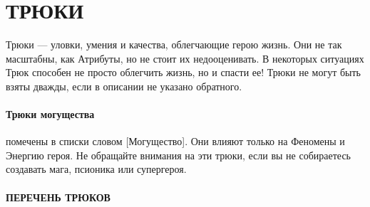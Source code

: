 \section{ТРЮКИ}
Трюки — уловки, умения и качества, облегчающие герою жизнь. Они не так масштабны, как Атрибуты, но не стоит их недооценивать. В некоторых ситуациях Трюк способен не просто облегчить жизнь, но и спасти ее! Трюки не могут быть взяты дважды, если в описании не указано обратного.
\paragraph{Трюки могущества} помечены в списки словом [Могущество]. Они влияют только на Феномены и Энергию героя. Не обращайте внимания на эти трюки, если вы не собираетесь создавать мага, псионика или супергероя.

\paragraph{ПЕРЕЧЕНЬ ТРЮКОВ}
